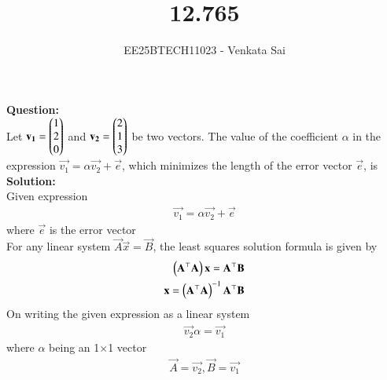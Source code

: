 \documentclass[journal]{IEEEtran}
\begin{document}


\title{12.765}
\author{EE25BTECH11023 - Venkata Sai}
\maketitle 
\renewcommand{\thefigure}{\theenumi}
\renewcommand{\thetable}{\theenumi}
\setlength{\intextsep}{10pt} %

\renewcommand{\thetable}{\theenumi}
\vspace{-1em}
\textbf{Question:}  \\
Let $\mathbf{v_1}=\begin{pmatrix}1\\2\\0\end{pmatrix}$ and $\mathbf{v_2}=\begin{pmatrix}2\\1\\3\end{pmatrix}$ be two vectors. The value of the coefficient $\alpha$ in the
expression $\vec{v_1} = \alpha \vec{v_2} +\vec{e}$, which minimizes the length of the error vector $\vec{e}$, is \\
\textbf{Solution:}  \\
Given expression
\begin{align}
    \vec{v_1} = \alpha \vec{v_2} +\vec{e}
\end{align}
where $\vec{e}$ is the error vector\\
 For any linear system $\vec{A}\vec{x}=\vec{B}$, the least squares solution formula is given by
 \begin{align}
     \left(\mathbf{A}^\top\mathbf{A}\right)\mathbf{x}=\mathbf{A}^\top\mathbf{B} \\
     \mathbf{x}= \left(\mathbf{A}^\top\mathbf{A}\right)^{-1}\mathbf{A}^\top\mathbf{B}
 \end{align}
 On writing the given expression as a linear system
 \begin{align}
     \vec{v_2}\alpha =\vec{v_1} 
 \end{align}
 where $\alpha$ being an 1$\times$1 vector
 \begin{align}
     \vec{A}=\vec{v_2},\vec{B}=\vec{v_1} 
     \end{align}
\end{document}
